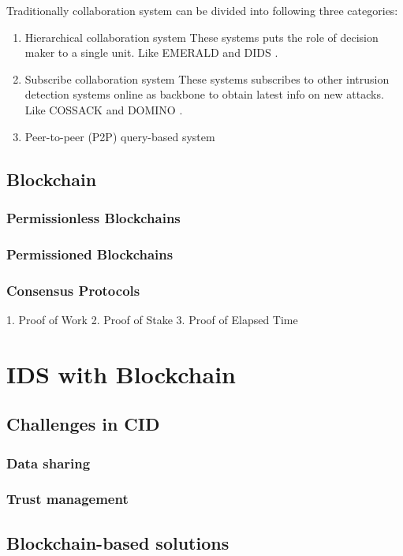\documentclass[12pt]{report}
\begin{document}
Traditionally collaboration system can be divided into following three categories:
\begin{enumerate}
	\item{Hierarchical collaboration system} These systems puts the role of decision maker to a single unit. Like EMERALD \cite{emerald-niss97} and DIDS \cite{Snapp1997DIDSI}.
	\item{Subscribe collaboration system} These systems subscribes to other intrusion detection systems online as backbone to obtain latest info on new attacks. Like COSSACK \cite{COSSACK} and DOMINO \cite{DOMINO}.
	\item{Peer-to-peer (P2P) query-based system}
\end{enumerate}

\section{Blockchain}
\subsection{Permissionless Blockchains}
\subsection{Permissioned Blockchains}
\subsection{Consensus Protocols}
1. Proof of Work
2. Proof of Stake
3. Proof of Elapsed Time

\chapter{IDS with Blockchain}
\section{Challenges in CID}
\subsection{Data sharing}
\subsection{Trust management}
\section{Blockchain-based solutions}
\end{document}
